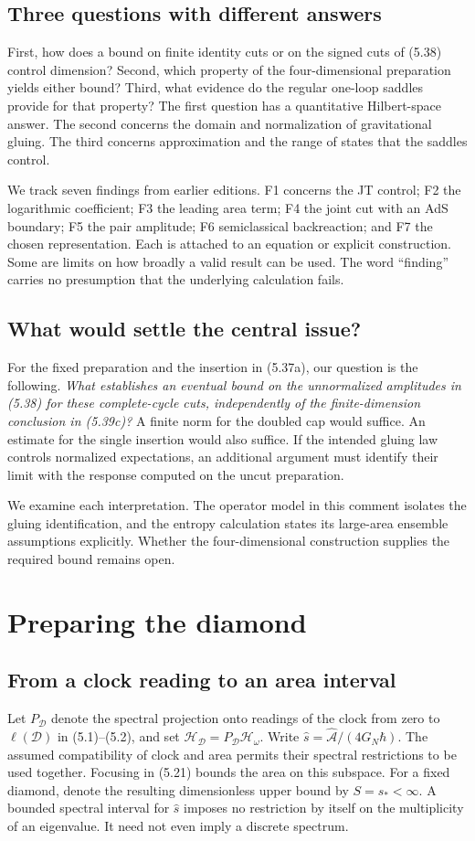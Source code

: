 \documentclass[11pt]{article}
\newcommand{\HH}{\mathcal H_{\mathcal D}}
\newcommand{\areaop}{\hat s}
\newcommand{\parttitle}[2]{\clearpage\section{#1}\markboth{#2}{#2}}
\begin{document}
\subsection{Three questions with different answers}
First, how does a bound on finite identity cuts or on the signed cuts of (5.38) control dimension? Second, which property of the four-dimensional preparation yields either bound? Third, what evidence do the regular one-loop saddles provide for that property? The first question has a quantitative Hilbert-space answer. The second concerns the domain and normalization of gravitational gluing. The third concerns approximation and the range of states that the saddles control.

We track seven findings from earlier editions. F1 concerns the JT control; F2 the logarithmic coefficient; F3 the leading area term; F4 the joint cut with an AdS boundary; F5 the pair amplitude; F6 semiclassical backreaction; and F7 the chosen representation. Each is attached to an equation or explicit construction. Some are limits on how broadly a valid result can be used. The word ``finding'' carries no presumption that the underlying calculation fails.

\subsection{What would settle the central issue?}
For the fixed preparation and the insertion in (5.37a), our question is the following. \emph{What establishes an eventual bound on the unnormalized amplitudes in (5.38) for these complete-cycle cuts, independently of the finite-dimension conclusion in (5.39c)?} A finite norm for the doubled cap would suffice. An estimate for the single insertion would also suffice. If the intended gluing law controls normalized expectations, an additional argument must identify their limit with the response computed on the uncut preparation.

We examine each interpretation. The operator model in this comment isolates the gluing identification, and the entropy calculation states its large-area ensemble assumptions explicitly. Whether the four-dimensional construction supplies the required bound remains open.

\parttitle{Preparing the diamond}{Preparing the diamond}
\subsection{From a clock reading to an area interval}
Let $P_{\mathcal D}$ denote the spectral projection onto readings of the clock from zero to $\ell(\mathcal D)$ in (5.1)--(5.2), and set $\HH=P_{\mathcal D}\mathcal H_\omega$. Write $\areaop=\widehat{\mathcal A}/(4G_N\hbar)$. The assumed compatibility of clock and area permits their spectral restrictions to be used together. Focusing in (5.21) bounds the area on this subspace. For a fixed diamond, denote the resulting dimensionless upper bound by $S=s_*<\infty$. A bounded spectral interval for $\areaop$ imposes no restriction by itself on the multiplicity of an eigenvalue. It need not even imply a discrete spectrum.
\end{document}
